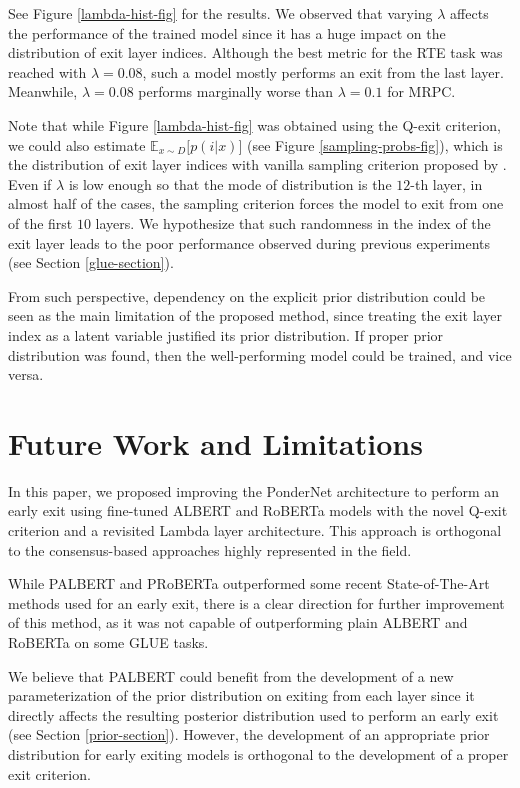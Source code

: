 \documentclass{article}
\begin{document}
See Figure \ref{lambda-hist-fig} for the results. We observed that varying $\lambda$ affects the performance of the trained model since it has a huge impact on the distribution of exit layer indices. Although the best metric for the RTE task was reached with $\lambda = 0.08$, such a model mostly performs an exit from the last layer. Meanwhile, $\lambda = 0.08$ performs marginally worse than $\lambda = 0.1$ for MRPC.

Note that while Figure \ref{lambda-hist-fig} was obtained using the Q-exit criterion, we could also estimate $\mathbb{E}_{x \sim D}\Big[p(i|x)\Big]$ (see Figure \ref{sampling-probs-fig}), which is the distribution of exit layer indices with vanilla sampling criterion proposed by \citet{pondernet}. Even if $\lambda$ is low enough so that the mode of distribution is the $12$-th layer, in almost half of the cases, the sampling criterion forces the model to exit from one of the first $10$ layers. We hypothesize that such randomness in the index of the exit layer leads to the poor performance observed during previous experiments (see Section \ref{glue-section}).

From such perspective, dependency on the explicit prior distribution could be seen as the main limitation of the proposed method, since treating the exit layer index as a latent variable justified its prior distribution. If proper prior distribution was found, then the well-performing model could be trained, and vice versa. 


\section{Future Work and Limitations}
\label{conclusion}

In this paper, we proposed improving the PonderNet architecture to perform an early exit using fine-tuned ALBERT and RoBERTa models with the novel Q-exit criterion and a revisited Lambda layer architecture. This approach is orthogonal to the consensus-based approaches \citep{pabee, leebert} highly represented in the field.

While PALBERT and PRoBERTa outperformed some recent State-of-The-Art methods used for an early exit, there is a clear direction for further improvement of this method, as it was not capable of outperforming plain ALBERT and RoBERTa on some GLUE tasks.

We believe that PALBERT could benefit from the development of a new parameterization of the prior distribution on exiting from each layer since it directly affects the resulting posterior distribution used to perform an early exit (see Section \ref{prior-section}). However, the development of an appropriate prior distribution for early exiting models is orthogonal to the development of a proper exit criterion.
\end{document}
